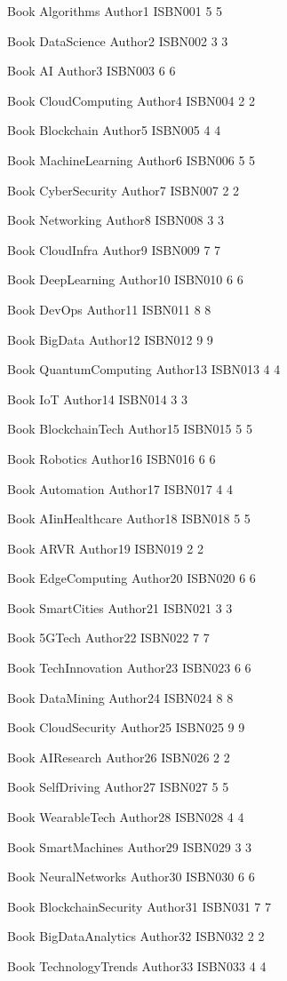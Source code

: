 Book
Algorithms Author1 ISBN001 5 5

Book
DataScience Author2 ISBN002 3 3

Book
AI Author3 ISBN003 6 6

Book
CloudComputing Author4 ISBN004 2 2

Book
Blockchain Author5 ISBN005 4 4

Book
MachineLearning Author6 ISBN006 5 5

Book
CyberSecurity Author7 ISBN007 2 2

Book
Networking Author8 ISBN008 3 3

Book
CloudInfra Author9 ISBN009 7 7

Book
DeepLearning Author10 ISBN010 6 6

Book
DevOps Author11 ISBN011 8 8

Book
BigData Author12 ISBN012 9 9

Book
QuantumComputing Author13 ISBN013 4 4

Book
IoT Author14 ISBN014 3 3

Book
BlockchainTech Author15 ISBN015 5 5

Book
Robotics Author16 ISBN016 6 6

Book
Automation Author17 ISBN017 4 4

Book
AIinHealthcare Author18 ISBN018 5 5

Book
ARVR Author19 ISBN019 2 2

Book
EdgeComputing Author20 ISBN020 6 6

Book
SmartCities Author21 ISBN021 3 3

Book
5GTech Author22 ISBN022 7 7

Book
TechInnovation Author23 ISBN023 6 6

Book
DataMining Author24 ISBN024 8 8

Book
CloudSecurity Author25 ISBN025 9 9

Book
AIResearch Author26 ISBN026 2 2

Book
SelfDriving Author27 ISBN027 5 5

Book
WearableTech Author28 ISBN028 4 4

Book
SmartMachines Author29 ISBN029 3 3

Book
NeuralNetworks Author30 ISBN030 6 6

Book
BlockchainSecurity Author31 ISBN031 7 7

Book
BigDataAnalytics Author32 ISBN032 2 2

Book
TechnologyTrends Author33 ISBN033 4 4

